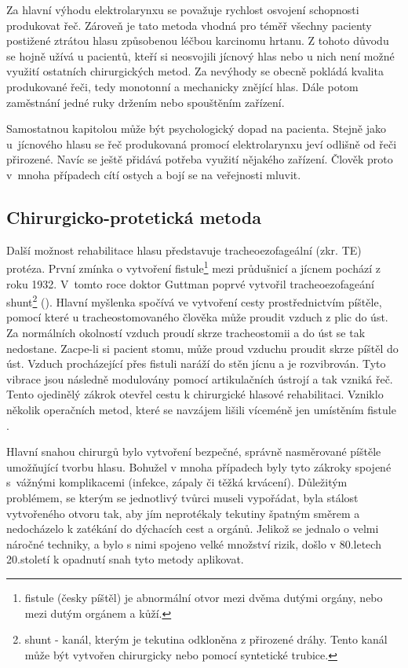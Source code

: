 Za hlavní výhodu elektrolarynxu se považuje rychlost osvojení schopnosti
produkovat řeč. Zároveň je tato metoda vhodná pro téměř všechny pacienty
postižené ztrátou hlasu způsobenou léčbou karcinomu hrtanu. Z tohoto důvodu se
hojně užívá u pacientů, kteří si neosvojili jícnový hlas nebo u nich není
možné využití ostatních chirurgických metod.
Za nevýhody se obecně pokládá kvalita produkované řeči, tedy monotonní a
mechanicky znějící hlas. Dále potom zaměstnání jedné ruky držením nebo
spouštěním zařízení.

Samostatnou kapitolou může být psychologický dopad na pacienta. Stejně jako
u~jícnového hlasu se řeč produkovaná promocí elektrolarynxu jeví odlišně od
řeči přirozené. Navíc se ještě přidává potřeba využití nějakého zařízení.
Člověk proto v~mnoha případech cítí ostych a bojí se na veřejnosti mluvit.



\subsection{Chirurgicko-protetická metoda} %
\label{chap:cause:treatment:tracheo}

Další možnost rehabilitace hlasu představuje tracheoezofageální (zkr. TE) protéza.
První zmínka o vytvoření fistule\footnote{fistule (česky píštěl) je abnormální
otvor mezi dvěma dutými orgány, nebo mezi dutým orgánem a kůží.} mezi
průdušnicí a jícnem pochází z roku 1932. V~tomto roce doktor Guttman poprvé
vytvořil tracheoezofageání shunt\footnote{shunt - kanál, kterým je tekutina
odkloněna z přirozené dráhy. Tento kanál může být vytvořen chirurgicky nebo
pomocí syntetické trubice.} (). Hlavní myšlenka spočívá ve
vytvoření cesty prostřednictvím píštěle, pomocí které u tracheostomovaného
člověka může proudit vzduch z plic do úst. Za normálních okolností vzduch
proudí skrze tracheostomii a do úst se tak nedostane. Zacpe-li si pacient
stomu, může proud vzduchu proudit skrze píštěl do úst. Vzduch procházející
přes fistuli naráží do stěn jícnu a je rozvibrován. Tyto vibrace jsou následně
modulovány pomocí artikulačních ústrojí a tak vzniká řeč.
Tento ojedinělý zákrok otevřel cestu k chirurgické hlasové rehabilitaci.
Vzniklo několik operačních metod, které se navzájem lišili víceméně jen
umístěním fistule \cite{Kramp2009}.

Hlavní snahou chirurgů bylo vytvoření bezpečné, správně nasměrované píštěle
umožňující tvorbu hlasu. Bohužel v mnoha případech byly tyto zákroky spojené
s~vážnými komplikacemi (infekce, zápaly či těžká krvácení). Důležitým
problémem, se kterým se jednotlivý tvůrci museli vypořádat, byla stálost
vytvořeného otvoru tak, aby jím neprotékaly tekutiny špatným směrem a
nedocházelo k zatékání do dýchacích cest a orgánů. Jelikož se jednalo o velmi
náročné techniky, a bylo s nimi spojeno velké množství rizik, došlo v
80.letech 20.století k opadnutí snah tyto metody aplikovat.

